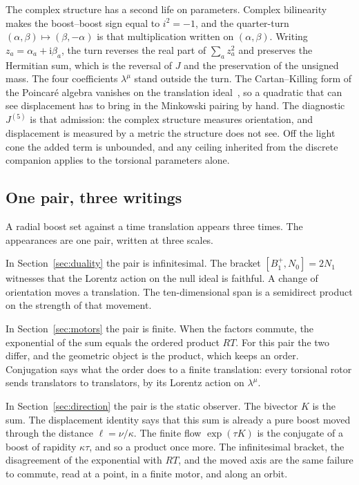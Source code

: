 \documentclass[a4paper]{article}
\begin{document}
The complex structure has a second life on parameters. Complex bilinearity makes the boost--boost sign equal to \(i^{2}=-1\), and the quarter-turn \((\alpha,\beta)\mapsto(\beta,-\alpha)\) is that multiplication written on \((\alpha,\beta)\). Writing \(z_{a}=\alpha_{a}+\mathrm{i}\beta_{a}\), the turn reverses the real part of \(\sum_{a}z_{a}^{2}\) and preserves the Hermitian sum, which is the reversal of \(J\) and the preservation of the unsigned mass. The four coefficients \(\lambda^{\mu}\) stand outside the turn. The Cartan--Killing form of the Poincar\'{e} algebra vanishes on the translation ideal~\cite{FultonHarris1991,Humphreys1972}, so a quadratic that can see displacement has to bring in the Minkowski pairing by hand. The diagnostic \(J^{(5)}\) is that admission: the complex structure measures orientation, and displacement is measured by a metric the structure does not see. Off the light cone the added term is unbounded, and any ceiling inherited from the discrete companion applies to the torsional parameters alone.

\subsection{One pair, three writings}

A radial boost set against a time translation appears three times. The appearances are one pair, written at three scales.

In Section~\ref{sec:duality} the pair is infinitesimal. The bracket \([B^{+}_{1},N_{0}]=2N_{1}\) witnesses that the Lorentz action on the null ideal is faithful. A change of orientation moves a translation. The ten-dimensional span is a semidirect product on the strength of that movement.

In Section~\ref{sec:motors} the pair is finite. When the factors commute, the exponential of the sum equals the ordered product \(RT\). For this pair the two differ, and the geometric object is the product, which keeps an order. Conjugation says what the order does to a finite translation: every torsional rotor sends translators to translators, by its Lorentz action on \(\lambda^{\mu}\).

In Section~\ref{sec:direction} the pair is the static observer. The bivector \(K\) is the sum. The displacement identity says that this sum is already a pure boost moved through the distance \(\ell=\nu/\kappa\). The finite flow \(\exp(\tau K)\) is the conjugate of a boost of rapidity \(\kappa\tau\), and so a product once more. The infinitesimal bracket, the disagreement of the exponential with \(RT\), and the moved axis are the same failure to commute, read at a point, in a finite motor, and along an orbit.
\end{document}
